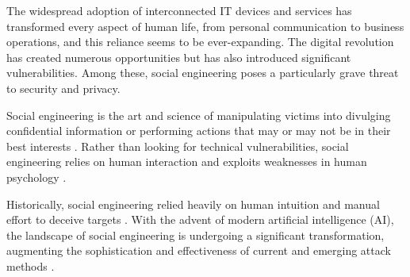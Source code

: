 \begin{comment}
    - Johdannon pituus määräytyy suhteessa koko kirjoitelman pituuteen. Parisivuinen kirjoitus ei erikseen otsikoitua johdantoa kaipaa, sillä se itsessään on laajennettu tiivistelmä. Kymmensivuisen kirjoituksen johdanto voi olla vaikkapa sivun tai puolentoista mittainen. Pro gradu -tutkielman 50-70-sivuiseen kokonaisuuteen tuntuu 2-4-sivuinen johdanto kohtuulliselta.

    - Johdanto kertoo siis lyhyessä, yleistajuisessa muodossa koko kirjoitelman kysymyksenasettelun, juonen sekä tulokset ja johtopäätelmät. Tämän luettuaan lukija voi päätellä, haluaako syventyä asiaan tarkemmin lukemalla koko kirjoituksen.

\end{comment}

The widespread adoption of interconnected IT devices and services has transformed every aspect of human life, from personal communication to business operations, and this reliance seems to be ever-expanding. The digital revolution has created numerous opportunities but has also introduced significant vulnerabilities. Among these, social engineering poses a particularly grave threat to security and privacy.

Social engineering is the art and science of manipulating victims into divulging confidential information or performing actions that may or may not be in their best interests \citep{hadnagySocialEngineering2018}. Rather than looking for technical vulnerabilities, social engineering relies on human interaction and exploits weaknesses in human psychology \citep{wangDefiningSocialEngineering2020}.




Historically, social engineering relied heavily on human intuition and manual effort to deceive targets \citep{mitnickArtDeceptionControlling2003}. With the advent of modern artificial intelligence (AI), the landscape of social engineering is undergoing a  significant transformation, augmenting the sophistication and effectiveness of current and emerging attack methods \citep{fakhouriAIDrivenSolutionsForSocialEngineeringAttacks2024}.



